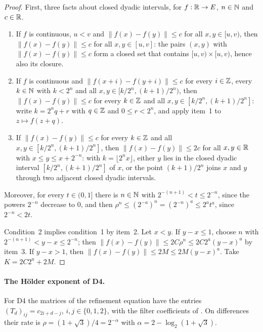 \begin{proof}
\leanok
First, three facts about closed dyadic intervals, for $f : \mathbb{R} \to E$, $n \in \mathbb{N}$ and $c \in \mathbb{R}$.
\begin{enumerate}
  \item If $f$ is continuous, $u < v$ and $\|f(x) - f(y)\| \leq c$ for all $x, y \in [u, v)$,
    then $\|f(x) - f(y)\| \leq c$ for all $x, y \in [u, v]$: the pairs $(x, y)$ with
    $\|f(x) - f(y)\| \leq c$ form a closed set that contains $[u, v) \times [u, v)$, hence also
    its closure.
  \item If $f$ is continuous and $\|f(x + i) - f(y + i)\| \leq c$ for every $i \in \mathbb{Z}$, every
    $k \in \mathbb{N}$ with $k < 2^n$ and all $x, y \in [k/2^n, (k+1)/2^n)$, then
    $\|f(x) - f(y)\| \leq c$ for every $k \in \mathbb{Z}$ and all $x, y \in [k/2^n, (k+1)/2^n]$: write
    $k = 2^n q + r$ with $q \in \mathbb{Z}$ and $0 \leq r < 2^n$, and apply item~1 to $z \mapsto f(z + q)$.
  \item If $\|f(x) - f(y)\| \leq c$ for every $k \in \mathbb{Z}$ and all $x, y \in [k/2^n, (k+1)/2^n]$,
    then $\|f(x) - f(y)\| \leq 2c$ for all $x, y \in \mathbb{R}$ with $x \leq y \leq x + 2^{-n}$: with
    $k = \lfloor 2^n x \rfloor$, either $y$ lies in the closed dyadic interval
    $[k/2^n, (k+1)/2^n]$ of $x$, or the point $(k+1)/2^n$ joins $x$ and $y$ through two
    adjacent closed dyadic intervals.
\end{enumerate}
Moreover, for every $t \in (0, 1]$ there is $n \in \mathbb{N}$ with $2^{-(n+1)} < t \leq 2^{-n}$, since
the powers $2^{-n}$ decrease to $0$, and then $\rho^n \leq (2^{-a})^n = (2^{-n})^a \leq 2^a t^a$,
since $2^{-n} < 2t$.

Condition~2 implies condition~1 by item~2. Let $x < y$. If $y - x \leq 1$, choose $n$ with
$2^{-(n+1)} < y - x \leq 2^{-n}$; then $\|f(x) - f(y)\| \leq 2C\rho^n \leq 2C 2^a (y - x)^a$ by
item~3. If $y - x > 1$, then $\|f(x) - f(y)\| \leq 2M \leq 2M (y - x)^a$. Take
$K = 2C 2^a + 2M$.
\end{proof}

\paragraph{The H\"older exponent of D4.}
For D4 the matrices of the refinement equation have the entries $(T_d)_{ij} = c_{2i + d - j}$,
$i, j \in \{0, 1, 2\}$, with the filter coefficients of . On
differences their rate is $\rho = (1 + \sqrt 3)/4 = 2^{-\alpha}$ with
$\alpha = 2 - \log_2(1 + \sqrt 3)$.

